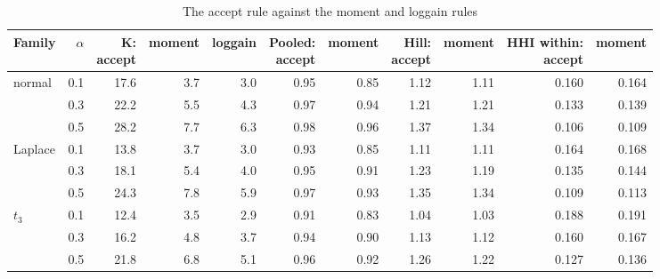 \begin{table}
\centering
\caption{The accept rule against the moment and loggain rules}
\label{tab:a19_accept}
\small
\begin{tabular}{lrrrrrrrrrr}
\toprule
Family & $\alpha$ & \makecell[b]{K:\\{}accept} & moment & loggain & \makecell[b]{Pooled:\\{}accept} & moment & \makecell[b]{Hill:\\{}accept} & moment & \makecell[b]{HHI within:\\{}accept} & moment \\
\midrule
normal & 0.1 & 17.6 & 3.7 & 3.0 & 0.95 & 0.85 & 1.12 & 1.11 & 0.160 & 0.164 \\
 & 0.3 & 22.2 & 5.5 & 4.3 & 0.97 & 0.94 & 1.21 & 1.21 & 0.133 & 0.139 \\
 & 0.5 & 28.2 & 7.7 & 6.3 & 0.98 & 0.96 & 1.37 & 1.34 & 0.106 & 0.109 \\
Laplace & 0.1 & 13.8 & 3.7 & 3.0 & 0.93 & 0.85 & 1.11 & 1.11 & 0.164 & 0.168 \\
 & 0.3 & 18.1 & 5.4 & 4.0 & 0.95 & 0.91 & 1.23 & 1.19 & 0.135 & 0.144 \\
 & 0.5 & 24.3 & 7.8 & 5.9 & 0.97 & 0.93 & 1.35 & 1.34 & 0.109 & 0.113 \\
$t_3$ & 0.1 & 12.4 & 3.5 & 2.9 & 0.91 & 0.83 & 1.04 & 1.03 & 0.188 & 0.191 \\
 & 0.3 & 16.2 & 4.8 & 3.7 & 0.94 & 0.90 & 1.13 & 1.12 & 0.160 & 0.167 \\
 & 0.5 & 21.8 & 6.8 & 5.1 & 0.96 & 0.92 & 1.26 & 1.22 & 0.127 & 0.136 \\
\bottomrule
\end{tabular}
\end{table}
